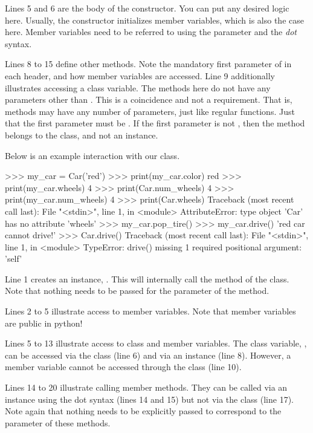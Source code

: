 \documentclass[a4paper]{exam}
\begin{document}
\begin{questions}
Lines 5 and 6 are the body of the constructor. You can put any desired logic here. Usually, the constructor initializes member variables, which is also the case here. Member variables need to be referred to using the  parameter and the \textit{dot} syntax.

Lines 8 to 15 define other methods. Note the mandatory first parameter of  in each header, and how member variables are accessed. Line 9 additionally illustrates accessing a class variable. The methods here do not have any parameters other than . This is a coincidence and not a requirement. That is, methods may have any number of parameters, just like regular functions. Just that the first parameter must be . If the first parameter is not , then the method belongs to the class, and not an instance.

Below is an example interaction with our class.

\begin{python}
>>> my_car = Car('red')
>>> print(my_car.color)
red
>>> print(my_car.wheels)
4
>>> print(Car.num_wheels)
4
>>> print(my_car.num_wheels)
4
>>> print(Car.wheels)
Traceback (most recent call last):
  File "<stdin>", line 1, in <module>
AttributeError: type object 'Car' has no attribute 'wheels'
>>> my_car.pop_tire()
>>> my_car.drive()
'red car cannot drive!'
>>> Car.drive()
Traceback (most recent call last):
  File "<stdin>", line 1, in <module>
TypeError: drive() missing 1 required positional argument: 'self'
\end{python}

Line 1 creates an instance, . This will internally call the  method of the  class. Note that nothing needs to be passed for the  parameter of the  method.

Lines 2 to 5 illustrate access to member variables. Note that member variables are public in python!

Lines 5 to 13 illustrate access to class and member variables. The class variable, , can be accessed via the class (line 6) and via an instance (line 8). However, a member variable cannot be accessed through the class (line 10).

Lines 14 to 20 illustrate calling member methods. They can be called via an instance using the dot syntax (lines 14 and 15) but not via the class (line 17). Note again that nothing needs to be explicitly passed to correspond to the  parameter of these methods.


\end{questions}
\end{document}
